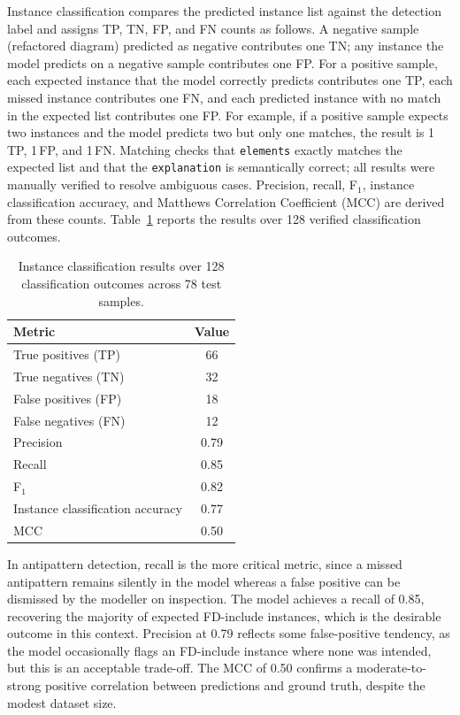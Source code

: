 \documentclass[12pt, a4paper]{article}
\begin{document}
Instance classification compares the predicted instance list against the
detection label and assigns TP, TN, FP, and FN counts as follows.  A
negative sample (refactored diagram) predicted as negative contributes one
TN; any instance the model predicts on a negative sample contributes one FP.
For a positive sample, each expected instance that the model correctly
predicts contributes one TP, each missed instance contributes one FN, and
each predicted instance with no match in the expected list contributes one
FP.  For example, if a positive sample expects two instances and the model
predicts two but only one matches, the result is 1\,TP, 1\,FP, and 1\,FN.
Matching checks that \texttt{elements} exactly matches the expected list and
that the \texttt{explanation} is semantically correct; all results were manually verified to resolve ambiguous cases.  Precision, recall, F$_1$,
instance classification accuracy, and Matthews Correlation Coefficient (MCC)
are derived from these counts.  Table~\ref{tab:metrics} reports the results
over 128 verified classification outcomes.

\begin{table}[h]
\centering
\caption{Instance classification results over 128 classification outcomes across 78 test samples.}
\label{tab:metrics}
\begin{tabular}{lc}
\toprule
\textbf{Metric} & \textbf{Value} \\
\midrule
True positives  (TP)   & 66    \\
True negatives  (TN)   & 32    \\
False positives (FP)   & 18    \\
False negatives (FN)   & 12    \\
\midrule
Precision               & 0.79 \\
Recall                  & 0.85 \\
F$_1$                   & 0.82 \\
Instance classification accuracy  & 0.77 \\
MCC                     & 0.50 \\
\bottomrule
\end{tabular}
\end{table}

In antipattern detection, recall is the more critical metric, since a missed
antipattern remains silently in the model whereas a false positive can be
dismissed by the modeller on inspection.  The model achieves a recall of 0.85, recovering the majority of expected
FD-include instances, which is the desirable outcome in this context.
Precision at 0.79 reflects some false-positive tendency, as the model
occasionally flags an FD-include instance where none was intended, but this
is an acceptable trade-off.  The MCC of 0.50 confirms a moderate-to-strong
positive correlation between predictions and ground truth, despite the modest
dataset size.
\end{document}

